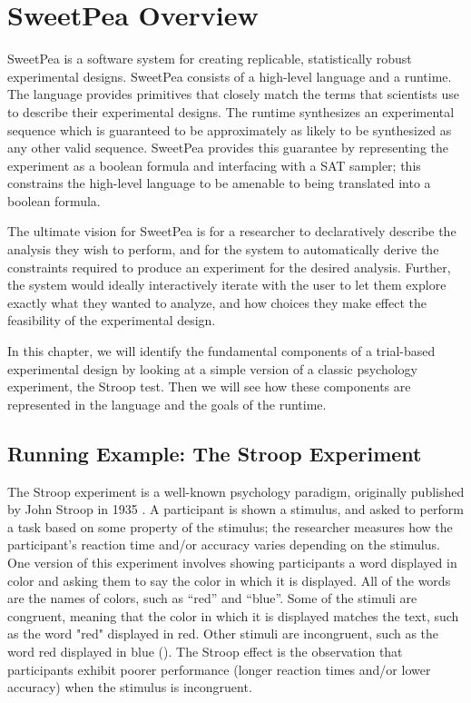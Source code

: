 
\chapter{SweetPea Overview}

SweetPea is a software system for creating replicable, statistically robust experimental designs. SweetPea consists of a high-level language and a runtime. The language provides primitives that closely match the terms that scientists use to describe their experimental designs. The runtime synthesizes an experimental sequence which is guaranteed to be approximately as likely to be synthesized as any other valid sequence. SweetPea provides this guarantee by representing the experiment as a boolean formula and interfacing with a SAT sampler; this constrains the high-level language to be amenable to being translated into a boolean formula.

The ultimate vision for SweetPea is for a researcher to declaratively describe the analysis they wish to perform, and for the system to automatically derive the constraints required to produce an experiment for the desired analysis. Further, the system would ideally interactively iterate with the user to let them explore exactly what they wanted to analyze, and how choices they make effect the feasibility of the experimental design.

In this chapter, we will identify the fundamental components of a trial-based experimental design by looking at a simple version of a classic psychology experiment, the Stroop test. Then we will see how these components are represented in the language and the goals of the runtime.

\section{Running Example: The Stroop Experiment}


The Stroop experiment is a well-known psychology paradigm, originally published by John Stroop in 1935 \cite{stroop1935studies}. A participant is shown a stimulus, and asked to perform a task based on some property of the stimulus; the researcher measures how the participant's reaction time and/or accuracy varies depending on the stimulus. One version of this experiment involves showing participants a word displayed in color and asking them to say the color in which it is displayed. All of the words are the names of colors, such as ``red'' and ``blue''. Some of the stimuli are congruent, meaning that the color in which it is displayed matches the text, such as the word "red" displayed in red. Other stimuli are incongruent, such as the word red displayed in blue (). The Stroop effect is the observation that participants exhibit poorer performance (longer reaction times and/or lower accuracy) when the stimulus is incongruent.


